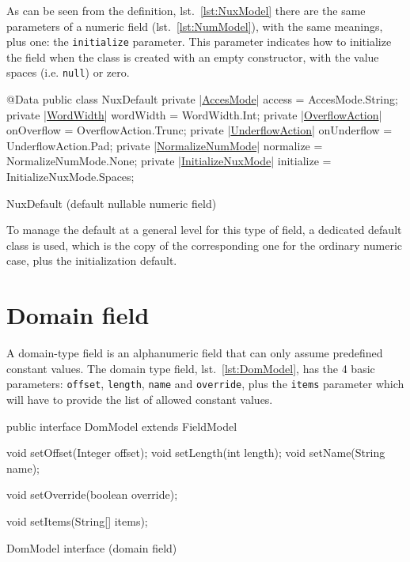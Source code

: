 \documentclass[a4paper,10pt]{report}
\newenvironment{elisting}[1][H]
  {\captionsetup{aboveskip=0pt}\begin{listing}[#1]}
  {\end{listing}%
}
\begin{document}
As can be seen from the definition, lst.~\ref{lst:NuxModel} there are the same 
parameters of a numeric field (lst.~\ref{lst:NumModel}), with the same meanings, 
plus one: the \verb!initialize! parameter. 
This parameter indicates how to initialize the field when the class is created 
with an empty constructor, with the value spaces (i.e. \verb!null!) or zero.

\begin{elisting}[!htb]
\begin{javacode}
@Data
public class NuxDefault {
    private |\hyperref[lst:AccesMode]{AccesMode}| access = AccesMode.String;
    private |\hyperref[lst:WordWidth]{WordWidth}| wordWidth = WordWidth.Int;
    private |\hyperref[lst:OverflowAction]{OverflowAction}| onOverflow = OverflowAction.Trunc;
    private |\hyperref[lst:UnderflowAction]{UnderflowAction}| onUnderflow = UnderflowAction.Pad;
    private |\hyperref[lst:NormalizeNumMode]{NormalizeNumMode}| normalize = NormalizeNumMode.None;
    private |\hyperref[lst:InitializeNuxMode]{InitializeNuxMode}| initialize = InitializeNuxMode.Spaces;
}
\end{javacode}
\caption{NuxDefault (default nullable numeric field)}
\label{lst:NuxDefault}
\end{elisting}

To manage the default at a general level for this type of field, a dedicated 
default class is used, which is the copy of the corresponding one for the 
ordinary numeric case, plus the initialization default.

\section{Domain field}
A domain-type field is an alphanumeric field that can only assume predefined 
constant values. 
The domain type field, lst.~\ref{lst:DomModel}, has the 4 basic parameters: 
\verb!offset!, \verb!length!, \verb!name! and \verb!override!, plus the 
\verb!items! parameter which will have to provide the list of allowed constant 
values.

\begin{elisting}[!htb]
\begin{javacode}
public interface DomModel extends FieldModel {
    void setOffset(Integer offset);
    void setLength(int length);
    void setName(String name);
    
    void setOverride(boolean override);
    
    void setItems(String[] items);
}
\end{javacode}
\caption{DomModel interface (domain field)}
\label{lst:DomModel}
\end{elisting}
\end{document}
